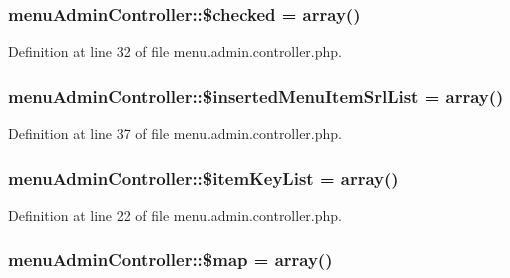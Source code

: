\subsubsection[{\$checked}]{\setlength{\rightskip}{0pt plus 5cm}menu\+Admin\+Controller\+::\$checked = array()}\label{classmenuAdminController_a37ff2e21ee9beb6c2b762bb36b7e4d69}


Definition at line 32 of file menu.\+admin.\+controller.\+php.

\hypertarget{classmenuAdminController_a4b64a6e1711227dce12e508d4eb3c861}{}
\subsubsection[{\$inserted\+Menu\+Item\+Srl\+List}]{\setlength{\rightskip}{0pt plus 5cm}menu\+Admin\+Controller\+::\$inserted\+Menu\+Item\+Srl\+List = array()}\label{classmenuAdminController_a4b64a6e1711227dce12e508d4eb3c861}


Definition at line 37 of file menu.\+admin.\+controller.\+php.

\hypertarget{classmenuAdminController_a776db5a961d918ad97f1c6ce7b34fc07}{}
\subsubsection[{\$item\+Key\+List}]{\setlength{\rightskip}{0pt plus 5cm}menu\+Admin\+Controller\+::\$item\+Key\+List = array()}\label{classmenuAdminController_a776db5a961d918ad97f1c6ce7b34fc07}


Definition at line 22 of file menu.\+admin.\+controller.\+php.

\hypertarget{classmenuAdminController_a9f7e4b726de0df35fa25694c702f88f8}{}
\subsubsection[{\$map}]{\setlength{\rightskip}{0pt plus 5cm}menu\+Admin\+Controller\+::\$map = array()}\label{classmenuAdminController_a9f7e4b726de0df35fa25694c702f88f8}


